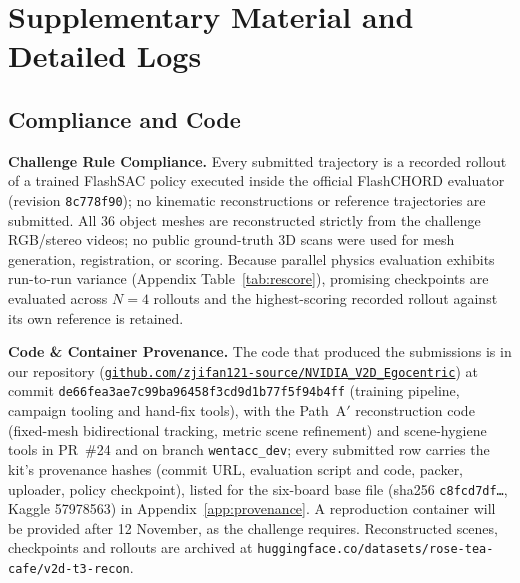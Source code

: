 \documentclass[10pt]{nvidiaextabstract}
\begin{document}
\section{Supplementary Material and Detailed Logs}
\label{sec:appendix}

\subsection{Compliance and Code}
\label{sec:compliance}
\textbf{Challenge Rule Compliance.} Every submitted trajectory is a recorded rollout of a trained FlashSAC policy executed inside the official FlashCHORD evaluator (revision \texttt{8c778f90}); no kinematic reconstructions or reference trajectories are submitted. All 36 object meshes are reconstructed strictly from the challenge RGB/stereo videos; no public ground-truth 3D scans were used for mesh generation, registration, or scoring. Because parallel physics evaluation exhibits run-to-run variance (Appendix Table~\ref{tab:rescore}), promising checkpoints are evaluated across $N=4$ rollouts and the highest-scoring recorded rollout against its own reference is retained.

\textbf{Code \& Container Provenance.} The code that produced the submissions is in our repository (\href{https://github.com/zjifan121-source/NVIDIA_V2D_Egocentric}{\texttt{github.com/\allowbreak zjifan121-source/\allowbreak NVIDIA\_V2D\_Egocentric}}) at commit \texttt{de66fea3ae7c99ba96458f3cd9d1b77f5f94b4ff} (training pipeline, campaign tooling and hand-fix tools), with the Path~A$'$ reconstruction code (fixed-mesh bidirectional tracking, metric scene refinement) and scene-hygiene tools in PR~\#24 and on branch \texttt{wentacc\_dev}; every submitted row carries the kit's provenance hashes (commit URL, evaluation script and code, packer, uploader, policy checkpoint), listed for the six-board base file (sha256 \texttt{c8fcd7df\ldots}, Kaggle 57978563) in Appendix~\ref{app:provenance}. A reproduction container will be provided after 12 November, as the challenge requires. Reconstructed scenes, checkpoints and rollouts are archived at \texttt{huggingface.co/\allowbreak datasets/\allowbreak rose-tea-cafe/\allowbreak v2d-t3-recon}.
\end{document}
